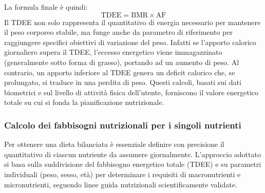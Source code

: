 \documentclass[11pt,a4paper]{article}
\begin{document}
La formula finale è quindi:
\[
\text{TDEE} = \text{BMR} \times \text{AF}
\]
Il TDEE non solo rappresenta il quantitativo di energia necessario per mantenere il peso corporeo stabile, ma funge anche da parametro di riferimento per raggiungere specifici obiettivi di variazione del peso. Infatti se l'apporto calorico giornaliero supera il TDEE, l'eccesso energetico viene immagazzinato (generalmente sotto forma di grasso), portando ad un aumento di peso. Al contrario, un apporto inferiore al TDEE genera un deficit calorico che, se prolungato, si traduce in una perdita di peso. Questi calcoli, basati sui dati biometrici e sul livello di attività fisica dell’utente, forniscono il valore energetico totale su cui si fonda la pianificazione nutrizionale.

\subsubsection{Calcolo dei fabbisogni nutrizionali per i singoli nutrienti}
Per ottenere una dieta bilanciata è essenziale definire con precisione il quantitativo di ciascun nutriente da assumere giornalmente. L'approccio adottato si basa sulla suddivisione del fabbisogno energetico totale (TDEE) e su parametri individuali (peso, sesso, età) per determinare i requisiti di macronutrienti e micronutrienti, seguendo linee guida nutrizionali scientificamente validate.
\end{document}
